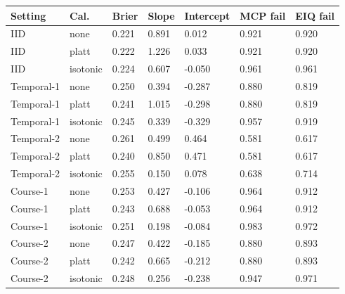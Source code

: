 \begin{tabular}{lllllll}
\toprule
Setting & Cal. & Brier & Slope & Intercept & MCP fail & EIQ fail\\
\midrule
IID & none & 0.221 & 0.891 & 0.012 & 0.921 & 0.920\\
IID & platt & 0.222 & 1.226 & 0.033 & 0.921 & 0.920\\
IID & isotonic & 0.224 & 0.607 & -0.050 & 0.961 & 0.961\\
Temporal-1 & none & 0.250 & 0.394 & -0.287 & 0.880 & 0.819\\
Temporal-1 & platt & 0.241 & 1.015 & -0.298 & 0.880 & 0.819\\
Temporal-1 & isotonic & 0.245 & 0.339 & -0.329 & 0.957 & 0.919\\
Temporal-2 & none & 0.261 & 0.499 & 0.464 & 0.581 & 0.617\\
Temporal-2 & platt & 0.240 & 0.850 & 0.471 & 0.581 & 0.617\\
Temporal-2 & isotonic & 0.255 & 0.150 & 0.078 & 0.638 & 0.714\\
Course-1 & none & 0.253 & 0.427 & -0.106 & 0.964 & 0.912\\
Course-1 & platt & 0.243 & 0.688 & -0.053 & 0.964 & 0.912\\
Course-1 & isotonic & 0.251 & 0.198 & -0.084 & 0.983 & 0.972\\
Course-2 & none & 0.247 & 0.422 & -0.185 & 0.880 & 0.893\\
Course-2 & platt & 0.242 & 0.665 & -0.212 & 0.880 & 0.893\\
Course-2 & isotonic & 0.248 & 0.256 & -0.238 & 0.947 & 0.971\\
\bottomrule
\end{tabular}